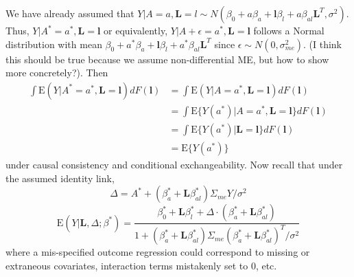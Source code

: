 \documentclass[12pt]{article}
\begin{document}
We have already assumed that $Y | A = a, \bm{L} = l \sim N(\beta_{0} + a\beta_{a} + \bm{l}\beta_{l} + a\beta_{al}\bm{L}^{T}, \sigma^{2})$. Thus, $Y | A^{*} = a^{*}, \bm{L} = \bm{l}$ or equivalently, $Y | A + \epsilon = a^{*}, \bm{L} = \bm{l}$ follows a Normal distribution with mean $\beta_{0} + a^{*}\beta_{a} + \bm{l}\beta_{l} + a^{*}\beta_{al}\bm{L}^{T}$ since $\epsilon \sim N(0, \sigma^{2}_{me})$. (I think this should be true because we assume non-differential ME, but how to show more concretely?). Then
\begin{align*}
\int \text{E}(Y | A^{*} = a^{*}, \bm{L} = \bm{l})dF(\bm{l}) &= \int \text{E}(Y | A = a^{*}, \bm{L} = \bm{l})dF(\bm{l}) \\
&= \int \text{E}\{ Y(a^{*}) | A = a^{*}, \bm{L} = \bm{l} \} dF(\bm{l}) \\
&= \int \text{E}\{ Y(a^{*}) | \bm{L} = \bm{l} \} dF(\bm{l}) \\
&= \text{E}\{ Y(a^{*}) \}
\end{align*}
under causal consistency and conditional exchangeability. Now recall that under the assumed identity link,
\begin{equation*}
\Delta = A^{*} + (\beta^{*}_{a} + \bm{L}\beta^{*}_{al}) \Sigma_{me}Y / \sigma^{2}
\end{equation*}
\begin{equation*}
\text{E}(Y | \bm{L}, \Delta; \beta^{*}) = \frac{\beta^{*}_{0} + \bm{L}\beta^{*}_{l} + \Delta \cdot (\beta^{*}_{a} + \bm{L}\beta^{*}_{al})}{1 + (\beta^{*}_{a} + \bm{L}\beta^{*}_{al}) \Sigma_{me} (\beta^{*}_{a} + \bm{L}\beta^{*}_{al})^{T} / \sigma^{2}}
\end{equation*}
where a mis-specified outcome regression could correspond to missing or extraneous covariates, interaction terms mistakenly set to 0, etc.
\end{document}
